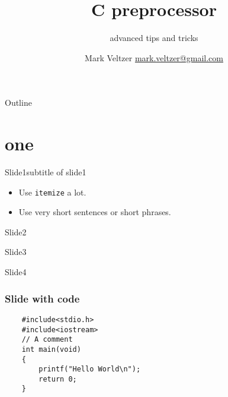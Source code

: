 \documentclass{beamer}
\title
{C preprocessor}
\subtitle
{advanced tips and tricks}
\author{Mark Veltzer \href{mailto:mark.veltzer@gmail.com}{mark.veltzer@gmail.com}}
\begin{document}
\begin{frame}
	\titlepage
\end{frame}

\begin{frame}{Outline}
	\tableofcontents
\end{frame}

\section{one}

\begin{frame}{Slide1}{subtitle of slide1}
	\begin{itemize}
		\item
			Use \texttt{itemize} a lot.
		\item
			Use very short sentences or short phrases.
	\end{itemize}
\end{frame}

\begin{frame}{Slide2}
\end{frame}

\begin{frame}{Slide3}
\end{frame}

\begin{frame}{Slide4}
\end{frame}

\begin{frame}[fragile]
\frametitle{Slide with code}
	\begin{lstlisting}
	#include<stdio.h>
	#include<iostream>
	// A comment
	int main(void)
	{
	    printf("Hello World\n");
	    return 0;
	}
	\end{lstlisting}
\end{frame}
\end{document}
